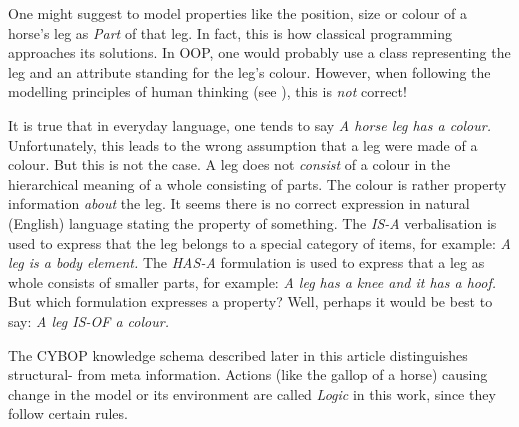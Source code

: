One might suggest to model properties like the position, size or colour of a
horse's leg as \emph{Part} of that leg. In fact, this is how classical
programming approaches its solutions. In OOP, one would probably use a class
representing the leg and an attribute standing for the leg's colour. However,
when following the modelling principles of human thinking (see
\cite{heller2004}), this is \emph{not} correct!

It is true that in everyday language, one tends to say \textit{A horse leg
\emph{has a} colour.} Unfortunately, this leads to the wrong assumption that a
leg were made of a colour. But this is not the case. A leg does not
\emph{consist} of a colour in the hierarchical meaning of a whole consisting of
parts. The colour is rather property information \emph{about} the leg. It seems
there is no correct expression in natural (English) language stating the
property of something. The \emph{IS-A} verbalisation is used to express that
the leg belongs to a special category of items, for example: \textit{A leg is a
body element.} The \emph{HAS-A} formulation is used to express that a leg as
whole consists of smaller parts, for example: \textit{A leg has a knee and it
has a hoof.} But which formulation expresses a property? Well, perhaps it would
be best to say: \textit{A leg IS-OF a colour.}

The CYBOP knowledge schema described later in this article distinguishes
structural- from meta information. Actions (like the gallop of a horse) causing
change in the model or its environment are called \emph{Logic} in this work,
since they follow certain rules.

